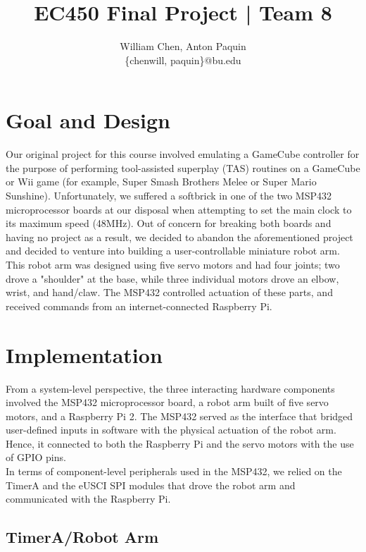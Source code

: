\documentclass[10pt]{article}
\title{\textbf{EC450 Final Project | Team 8}}
\author{William Chen,
		Anton Paquin\\ \{chenwill, paquin\}@bu.edu}
\date{}
\begin{document}
\maketitle

\section{Goal and Design}

Our original project for this course involved emulating a GameCube controller for the purpose of performing tool-assisted superplay (TAS) routines on a GameCube or Wii game (for example, Super Smash Brothers Melee or Super Mario Sunshine). Unfortunately, we suffered a softbrick in one of the two MSP432 microprocessor boards at our disposal when attempting to set the main clock to its maximum speed (48MHz). Out of concern for breaking both boards and having no project as a result, we decided to abandon the aforementioned project and decided to venture into building a user-controllable miniature robot arm. \\ \newline
This robot arm was designed using five servo motors and had four joints; two drove a "shoulder" at the base, while three individual motors drove an elbow, wrist, and hand/claw. The MSP432 controlled actuation of these parts, and received commands from an internet-connected Raspberry Pi.

\section{Implementation}

From a system-level perspective, the three interacting hardware components involved the MSP432 microprocessor board, a robot arm built of five servo motors, and a Raspberry Pi 2. The MSP432 served as the interface that bridged user-defined inputs in software with the physical actuation of the robot arm. Hence, it connected to both the Raspberry Pi and the servo motors with the use of GPIO pins. \\ \newline
In terms of component-level peripherals used in the MSP432, we relied on the TimerA and the eUSCI SPI modules that drove the robot arm and communicated with the Raspberry Pi. 

\subsection{TimerA/Robot Arm}
\end{document}
